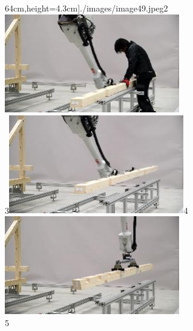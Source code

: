 \documentclass[11pt]{book}
\begin{document}
64cm,height=4.3cm]{./images/image49.jpeg}2\includegraphics[width=7.64cm,height=4.3cm]{./images/image50.jpeg} \\ 3\includegraphics[width=7.64cm,height=4.3cm]{./images/image51.jpeg}4\includegraphics[width=7.64cm,height=4.3cm]{./images/image52.jpeg} \\ 5\inclu
\end{document}
